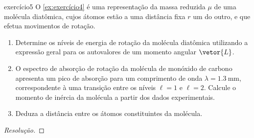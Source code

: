 \begin{exercício}{}{exercício5}
    O \cref{ex:exercício4} é uma representação da massa reduzida \(\mu\) de uma molécula diatômica, cujos átomos estão a uma distância fixa \(r\) um do outro, e que efetua movimentos de rotação.
    \begin{enumerate}[label=(\alph*)]
        \item Determine os níveis de energia de rotação da molécula diatômica utilizando a expressão geral para os autovalores de um momento angular \(\vetor{L}\).
        \item O espectro de absorção de rotação da molécula de monóxido de carbono apresenta um pico de absorção para um comprimento de onda \(\lambda = \SI{1.3}{\milli\meter}\), correspondente à uma transição entre os níveis \(\ell = 1\) e \(\ell = 2\). Calcule o momento de inércia da molécula a partir dos dados experimentais.
        \item Deduza a distância entre os átomos constituintes da molécula. \todo[Para \(N_A\) átomos, C = \SI{12}{g}, O = \SI{16}{g}.]
    \end{enumerate}
\end{exercício}
\begin{proof}[Resolução]

\end{proof}
